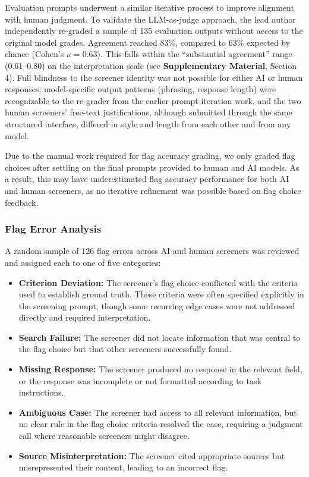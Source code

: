 \documentclass[12pt]{article}
\begin{document}
Evaluation prompts underwent a similar iterative process to improve alignment with human judgment. To validate the LLM-as-judge approach, the lead author independently re-graded a sample of 135 evaluation outputs without access to the original model grades. Agreement reached 83\%, compared to 63\% expected by chance (Cohen's $\kappa = 0.63$). This falls within the ``substantial agreement'' range (0.61--0.80) on the \citet{LandisKoch1977} interpretation scale (see \textbf{Supplementary Material}, Section 4). Full blindness to the screener identity was not possible for either AI or human responses: model-specific output patterns (phrasing, response length) were recognizable to the re-grader from the earlier prompt-iteration work, and the two human screeners' free-text justifications, although submitted through the same structured interface, differed in style and length from each other and from any model.

Due to the manual work required for flag accuracy grading, we only graded flag choices after settling on the final prompts provided to human and AI models. As a result, this may have underestimated flag accuracy performance for both AI and human screeners, as no iterative refinement was possible based on flag choice feedback.

\subsubsection{Flag Error Analysis}

A random sample of 126 flag errors across AI and human screeners was reviewed and assigned each to one of five categories:

\begin{itemize}
\item \textbf{Criterion Deviation:} The screener's flag choice conflicted with the criteria used to establish ground truth. These criteria were often specified explicitly in the screening prompt, though some recurring edge cases were not addressed directly and required interpretation.
\item \textbf{Search Failure:} The screener did not locate information that was central to the flag choice but that other screeners successfully found.
\item \textbf{Missing Response:} The screener produced no response in the relevant field, or the response was incomplete or not formatted according to task instructions.
\item \textbf{Ambiguous Case:} The screener had access to all relevant information, but no clear rule in the flag choice criteria resolved the case, requiring a judgment call where reasonable screeners might disagree.
\item \textbf{Source Misinterpretation:} The screener cited appropriate sources but misrepresented their content, leading to an incorrect flag.
\end{itemize}
\end{document}

